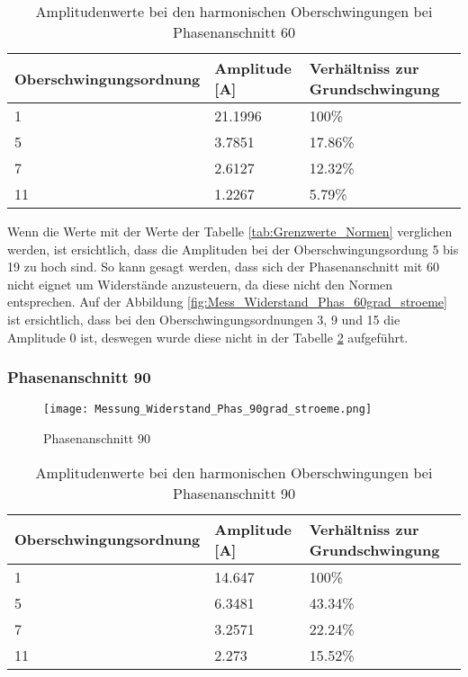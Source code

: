 \begin{table}[ht!]
	\centering
	\begin{tabular}{|l|l|l|}
		\hline
		Oberschwingungsordnung & Amplitude [A] 	& Verhältniss zur Grundschwingung	\\ \hline
		1                      & 21.1996   		& 100\%								\\ \hline
		5                      & 3.7851    		& 17.86\%							\\ \hline
		7                      & 2.6127    		& 12.32\%							\\ \hline
		11                     & 1.2267    		& 5.79\%							\\ \hline
	\end{tabular}
	\caption{Amplitudenwerte bei den harmonischen Oberschwingungen bei Phasenanschnitt 60\textdegree}\label{tab:Phas_60_Stroeme}
\end{table}

Wenn die Werte mit der Werte der Tabelle \ref{tab:Grenzwerte_Normen} verglichen werden, ist ersichtlich, dass die Amplituden bei der Oberschwingungsordung 5 bis 19 zu hoch sind. So kann gesagt werden, dass sich der Phasenanschnitt mit 60\textdegree \hspace{0.02cm} nicht eignet um Widerstände anzusteuern, da diese nicht den Normen entsprechen. Auf der Abbildung \ref{fig:Mess_Widerstand_Phas_60grad_stroeme} ist ersichtlich, dass bei den Oberschwingungsordnungen 3, 9 und 15 die Amplitude 0 ist, deswegen wurde diese nicht in der Tabelle \ref{tab:Phas_90_Stroeme} aufgeführt.


\subsubsection*{Phasenanschnitt 90\textdegree}
\begin{figure}[ht!]
	\centering
	\texttt{[image: Messung\_Widerstand\_Phas\_90grad\_stroeme.png]}	
	\caption{Phasenanschnitt 90\textdegree}\label{fig:Mess_Widerstand_Phas_90grad_stroeme}
\end{figure}

\begin{table}[ht!]
	\centering
	\begin{tabular}{|l|l|l|}
		\hline
		Oberschwingungsordnung 	& Amplitude [A] & Verhältniss zur Grundschwingung	\\ \hline
		1       				& 14.647   		& 100\%								\\ \hline
		5      					& 6.3481    	& 43.34\%							\\ \hline
		7      					& 3.2571    	& 22.24\%							\\ \hline
		11      				& 2.273    		& 15.52\%							\\ \hline
	\end{tabular}
	\caption{Amplitudenwerte bei den harmonischen Oberschwingungen bei Phasenanschnitt 90\textdegree}\label{tab:Phas_90_Stroeme}
\end{table}

